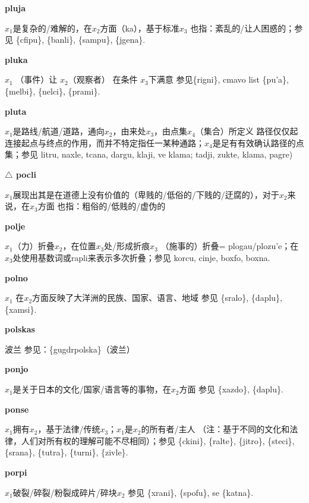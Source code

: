 \documentclass[notitlepage,twocolumn,a4paper,10pt]{book}
\begin{document}
{\sffamily\bfseries pluja}\enspace {\ttfamily\bfseries[luj]}  $x_1$是复杂的\slash{}难解的，在$x_2$方面（ka），基于标准$x_3$ \textemdash{} 也指：紊乱的\slash{}让人困惑的；参见 \{cfipu\}, \{banli\}, \{sampu\}, \{jgena\}.

{\sffamily\bfseries pluka}\enspace {\ttfamily\bfseries[puk     pu'a]}  $x_{1}$ （事件）让 $x_{2}$（观察者） 在条件 $x_{3}$下满意 \textemdash{} 参见\{rigni\}, cmavo list \{pu'a\}, \{melbi\}, \{nelci\}, \{prami\}.

{\sffamily\bfseries pluta}\enspace {\ttfamily\bfseries[lut     lu'a]}  $x_1$是路线\slash{}航道\slash{}道路，通向$x_2$，由来处$x_3$，由点集$x_4$（集合）所定义 \textemdash{} 路径仅仅起连接起点与终点的作用，而并不特定指任一某种通路；$x_4$是足有有效确认路径的点集；参见 {litru}, {naxle}, {tcana}, {dargu}, {klaji}, ve {klama}; {tadji}, {zukte}, {klama}, {pagre})

{\sffamily\bfseries $\triangle$ pocli} $x_1$展现出其是在道德上没有价值的（卑贱的\slash{}低俗的\slash{}下贱的\slash{}迂腐的），对于$x_2$来说，在$x_3$方面 \textemdash{} 也指：粗俗的\slash{}低贱的\slash{}虚伪的

{\sffamily\bfseries polje}\enspace {\ttfamily\bfseries[    plo]}  $x_1$（力）折叠$x_2$，在位置$x_3$处\slash{}形成折痕$x_3$ \textemdash{} （施事的）折叠= {plogau}\slash{}{plozu'e}；在$x_3$处使用基数词或{rapli}来表示多次折叠；参见 {korcu}, {cinje}, {boxfo}, {boxna}.

{\sffamily\bfseries polno}\enspace {\ttfamily\bfseries[pol]}  $x_{1}$ 在$x_{2}$方面反映了大洋洲的民族、国家、语言、地域 \textemdash{} 参见 \{sralo\}, \{daplu\}, \{xamsi\}.

{\sffamily\bfseries polskas} 波兰 \textemdash{} 参见：\{gugdrpolska\}（波兰）

{\sffamily\bfseries ponjo}\enspace {\ttfamily\bfseries[pon     po'o]}  $x_1$是关于日本的文化\slash{}国家\slash{}语言等的事物，在$x_2$方面 \textemdash{} 参见 \{xazdo\}, \{daplu\}.

{\sffamily\bfseries ponse}\enspace {\ttfamily\bfseries[pos     po'e]}  $x_1$拥有$x_2$，基于法律\slash{}传统$x_3$；$x_1$是$x_2$的所有者\slash{}主人 \textemdash{} （注：基于不同的文化和法律，人们对所有权的理解可能不尽相同）；参见 \{ckini\}, \{ralte\}, \{jitro\}, \{steci\}, \{srana\}, \{tutra\}, \{turni\}, \{zivle\}.

{\sffamily\bfseries porpi}\enspace {\ttfamily\bfseries[pop     po'i]}  $x_1$破裂\slash{}碎裂\slash{}粉裂成碎片\slash{}碎块$x_2$ \textemdash{} 参见 \{xrani\}, \{spofu\}, se \{katna\}.
\end{document}
